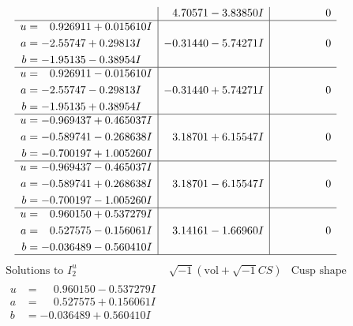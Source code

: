 \documentclass[1p]{elsarticle_modified}
\theoremstyle{definition}
\newcommand{\I}{\sqrt{-1}}
\begin{document}
$$\begin{array}{c|c|c}
 & \phantom{-}4.70571 - 3.83850 I & \phantom{-0.000000 } 0 \\ \hline\begin{aligned}
u &= \phantom{-}0.926911 + 0.015610 I \\
a &= -2.55747 + 0.29813 I \\
b &= -1.95135 - 0.38954 I\end{aligned}
 & -0.31440 - 5.74271 I & \phantom{-0.000000 } 0 \\ \hline\begin{aligned}
u &= \phantom{-}0.926911 - 0.015610 I \\
a &= -2.55747 - 0.29813 I \\
b &= -1.95135 + 0.38954 I\end{aligned}
 & -0.31440 + 5.74271 I & \phantom{-0.000000 } 0 \\ \hline\begin{aligned}
u &= -0.969437 + 0.465037 I \\
a &= -0.589741 - 0.268638 I \\
b &= -0.700197 + 1.005260 I\end{aligned}
 & \phantom{-}3.18701 + 6.15547 I & \phantom{-0.000000 } 0 \\ \hline\begin{aligned}
u &= -0.969437 - 0.465037 I \\
a &= -0.589741 + 0.268638 I \\
b &= -0.700197 - 1.005260 I\end{aligned}
 & \phantom{-}3.18701 - 6.15547 I & \phantom{-0.000000 } 0 \\ \hline\begin{aligned}
u &= \phantom{-}0.960150 + 0.537279 I \\
a &= \phantom{-}0.527575 - 0.156061 I \\
b &= -0.036489 - 0.560410 I\end{aligned}
 & \phantom{-}3.14161 - 1.66960 I & \phantom{-0.000000 } 0\\
 \hline 
 \end{array}$$\newpage$$\begin{array}{c|c|c}  
\text{Solutions to }I^u_{2}& \I (\text{vol} + \sqrt{-1}CS) & \text{Cusp shape}\\
 \hline 
\begin{aligned}
u &= \phantom{-}0.960150 - 0.537279 I \\
a &= \phantom{-}0.527575 + 0.156061 I \\
b &= -0.036489 + 0.560410 I\end{aligned}

\end{array}$$
\end{document}

